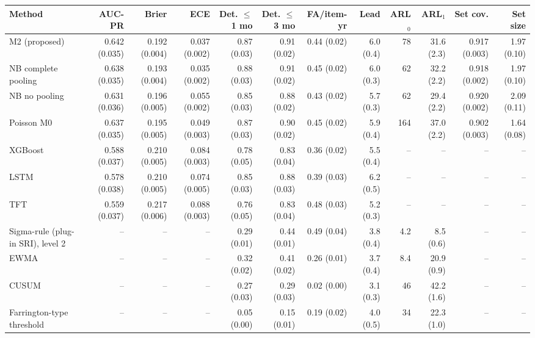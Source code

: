 \documentclass[10pt,a4paper]{article}
\begin{document}
\begin{landscape}
\noindent\begin{minipage}{\linewidth}
\label{tab:S2-gradual}
\centering\scriptsize
\begin{tabular}{lrrrrrrrrrrr}
\toprule
Method & AUC-PR & Brier & ECE & Det. $\le$1 mo & Det. $\le$3 mo & FA/item-yr & Lead & ARL$_0$ & ARL$_1$ & Set cov. & Set size \\ \midrule
M2 (proposed) & 0.642 (0.035) & 0.192 (0.004) & 0.037 (0.002) & 0.87 (0.03) & 0.91 (0.02) & 0.44 (0.02) & 6.0 (0.4) & 78 & 31.6 (2.3) & 0.917 (0.003) & 1.97 (0.10) \\
NB complete pooling & 0.638 (0.035) & 0.193 (0.004) & 0.035 (0.002) & 0.88 (0.03) & 0.91 (0.02) & 0.45 (0.02) & 6.0 (0.3) & 62 & 32.2 (2.2) & 0.918 (0.002) & 1.97 (0.10) \\
NB no pooling & 0.631 (0.036) & 0.196 (0.005) & 0.055 (0.002) & 0.85 (0.03) & 0.88 (0.02) & 0.43 (0.02) & 5.7 (0.3) & 62 & 29.4 (2.2) & 0.920 (0.002) & 2.09 (0.11) \\
Poisson M0 & 0.637 (0.035) & 0.195 (0.005) & 0.049 (0.003) & 0.87 (0.03) & 0.90 (0.02) & 0.45 (0.02) & 5.9 (0.4) & 164 & 37.0 (2.2) & 0.902 (0.003) & 1.64 (0.08) \\
XGBoost & 0.588 (0.037) & 0.210 (0.005) & 0.084 (0.003) & 0.78 (0.05) & 0.83 (0.04) & 0.36 (0.02) & 5.5 (0.4) & – & – & – & – \\
LSTM & 0.578 (0.038) & 0.210 (0.005) & 0.074 (0.005) & 0.85 (0.03) & 0.88 (0.03) & 0.39 (0.03) & 6.2 (0.5) & – & – & – & – \\
TFT & 0.559 (0.037) & 0.217 (0.006) & 0.088 (0.003) & 0.76 (0.05) & 0.83 (0.04) & 0.48 (0.03) & 5.2 (0.3) & – & – & – & – \\
Sigma-rule (plug-in SRI), level 2 & – & – & – & 0.29 (0.01) & 0.44 (0.01) & 0.49 (0.04) & 3.8 (0.4) & 4.2 & 8.5 (0.6) & – & – \\
EWMA & – & – & – & 0.32 (0.02) & 0.41 (0.02) & 0.26 (0.01) & 3.7 (0.4) & 8.4 & 20.9 (0.9) & – & – \\
CUSUM & – & – & – & 0.27 (0.03) & 0.29 (0.03) & 0.02 (0.00) & 3.1 (0.3) & 46 & 42.2 (1.6) & – & – \\
Farrington-type threshold & – & – & – & 0.05 (0.00) & 0.15 (0.01) & 0.19 (0.02) & 4.0 (0.5) & 34 & 22.3 (1.0) & – & – \\
\bottomrule
\end{tabular}
\par\vspace{3pt}{\scriptsize Stable windows are the 24 months before the change at month 60; ARL$_1$ is the delay from the change to the first (persistent) alarm.}
\end{minipage}
\vspace{22pt}
\end{landscape}
\end{document}
